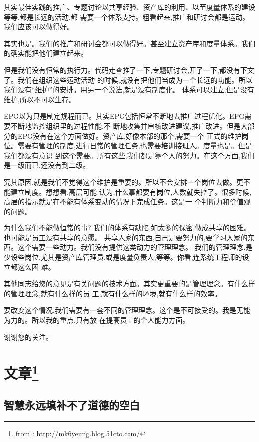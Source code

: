\documentclass[11pt]{article}
\begin{document}
\begin{yang}
  \ylogo 其实最佳实践的推广、专题讨论以共享经验、资产库的利用、以至度量体系的建设等等,都是长远的活动,都
  需要一个体系支持。粗看起来,推广和研讨会都是运动。我们应该可以做得好。

  其实也是。我们的推广和研讨会都可以做得好。甚至建立资产库和度量体系。我们的确实能把他们建立起来。

  但是我们没有恒常的执行力。代码走查推了一下,专题研讨会,开了一下,都没有下文了。我们在组织这些运动活动
  的时候,就没有把他们当成为一个长远的功能。所以我们没有``维护''的安排。用另一个说法,就是没有制度化。
  体系可以建立,但是没有维护,所以不可以生存。

  EPG以为只是制定规程而已。其实EPG包括恒常不断地去推广过程优化。EPG需要不断地监控组织里的过程性能,不
  断地收集并审核改进建议,推广改进。但是大部分的EPG没有在这个方面做好。资产库,好像本部的那个,需要一个
  正式的维护岗位。需要有管理的制度,进行日常的管理任务,也需要培训接班人。度量也是。但是我们都没有意识
  到这个需要。所有这些,我们都是靠个人的努力。在这个方面,我们是一级而已,还没有到二级。

  究其原因,就是我们不觉得这个维护是重要的。所以不会安排一个岗位去做。更不能建立制度。想想看,高层可能
  认为,什么事都要有岗位,人数就失控了。很多时候,高层的指示就是在不能有体系变动的情况下完成任务。这是一
  个判断力和价值观的问题。

  为什么我们不能做恒常的事? 我们的体系有缺陷,如太多的保密,做成共享的困难。也可能是员工没有共享的意愿。
  共享人家的东西,自己是要努力的,要学习人家的东西。这个需要一些动力。我们没有提供这类动力的管理理念。
  我们的管理理念,是少设些岗位,尤其是资产库管理员,或是度量负责人,等等。你看,连系统工程师的设立都这么困
  难。

  其他同志给您的意见是有关问题的技术方面。其实更重要的是管理理念。有什么样的管理理念,就有什么样的员
  工,就有什么样的环境,就有什么样的效率。

  要改变这个情况,我们需要有一套不同的管理理念。这个是不可接受的。我是无能为力的。所以我的重点,只有放
  在提高员工的个人能力方面。

  谢谢您的关注。
\end{yang}

\pagebreak
\section{文章\footnote{\textsf{from : http://mk6yeung.blog.51cto.com/}}}
\subsection{智慧永远填补不了道德的空白}
\it
\end{document}
